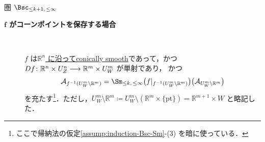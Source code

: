 \documentclass[TQFT_main]{subfiles}
\begin{document}
\begin{mydef}[label=def:Bsc-induction,breakable]{圏 $\Bsc_{\le k+1,\, \le \infty}$}
\begin{description}
\begin{description}
            \item[\textbf{$\bm{f}$ がコーンポイントを保存する場合}]　 
            
            $f$ は\hyperref[def:c-smooth-along]{$\mathbb{R}^n$ に沿ってconically smooth}であって，かつ $Df \colon \mathbb{R}^n \times U^n_Z \longrightarrow \mathbb{R}^m \times U^m_W$ が単射であり，
            かつ
            \begin{align}
                \mathcal{A}_{f^{-1}(U^m_W \setminus \mathbb{R}^m)} = \Sm_{\le k,\, \le \infty} \bigl( f|_{f^{-1}(U^m_W \setminus \mathbb{R}^m)} \bigr) \bigl(\mathcal{A}_{U^m_W \setminus \mathbb{R}^m}\bigr)
            \end{align}
            を充たす\footnote{ここで帰納法の仮定\ref{assump:induction-Bsc-Sm}-(3) を暗に使っている．}．ただし，$U^m_W \setminus \mathbb{R}^m \coloneqq U^m_W \setminus (\mathbb{R}^m \times \{\mathrm{pt}\}) = \mathbb{R}^{m+1} \times W$ と略記した．
        \end{description}
        
    \end{description}
\end{mydef}
\end{document}
